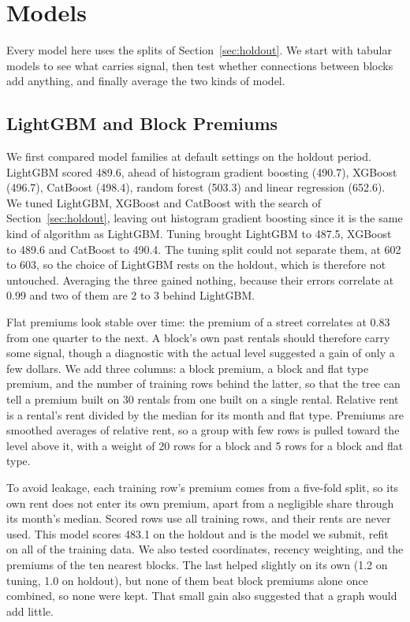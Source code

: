 \section{Models}
\label{sec:models}

Every model here uses the splits of Section~\ref{sec:holdout}. We start with tabular models to see what carries signal, then test whether connections between blocks add anything, and finally average the two kinds of model.

\subsection{LightGBM and Block Premiums}
\label{sec:lightgbm}

We first compared model families at default settings on the holdout period. LightGBM \cite{Ke:2017:LightGBM} scored 489.6, ahead of histogram gradient boosting (490.7), XGBoost \cite{Chen:2016:XGBoost} (496.7), CatBoost \cite{Prokhorenkova:2018:CatBoost} (498.4), random forest (503.3) and linear regression (652.6). We tuned LightGBM, XGBoost and CatBoost with the search of Section~\ref{sec:holdout}, leaving out histogram gradient boosting since it is the same kind of algorithm as LightGBM. Tuning brought LightGBM to 487.5, XGBoost to 489.6 and CatBoost to 490.4. The tuning split could not separate them, at 602 to 603, so the choice of LightGBM rests on the holdout, which is therefore not untouched. Averaging the three gained nothing, because their errors correlate at 0.99 and two of them are 2 to 3 behind LightGBM.

Flat premiums look stable over time: the premium of a street correlates at 0.83 from one quarter to the next. A block's own past rentals should therefore carry some signal, though a diagnostic with the actual level suggested a gain of only a few dollars. We add three columns: a block premium, a block and flat type premium, and the number of training rows behind the latter, so that the tree can tell a premium built on 30 rentals from one built on a single rental. Relative rent is a rental's rent divided by the median for its month and flat type. Premiums are smoothed averages of relative rent, so a group with few rows is pulled toward the level above it, with a weight of 20 rows for a block and 5 rows for a block and flat type.

To avoid leakage, each training row's premium comes from a five-fold split, so its own rent does not enter its own premium, apart from a negligible share through its month's median. Scored rows use all training rows, and their rents are never used. This model scores 483.1 on the holdout and is the model we submit, refit on all of the training data. We also tested coordinates, recency weighting, and the premiums of the ten nearest blocks. The last helped slightly on its own (1.2 on tuning, 1.0 on holdout), but none of them beat block premiums alone once combined, so none were kept. That small gain also suggested that a graph would add little.

